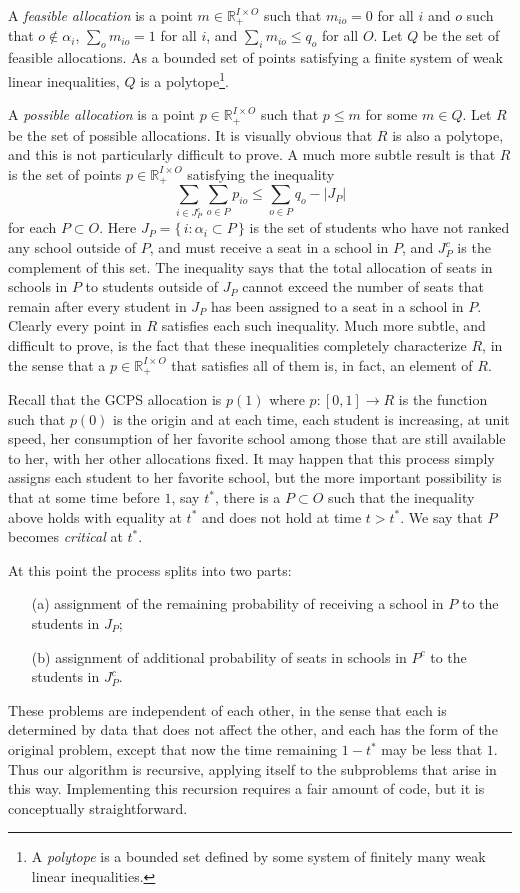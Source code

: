 \documentclass[12pt]{article}
\theoremstyle{definition}
\renewcommand{\Re}{\mathbb{R}}
\begin{document}
\begin{appendix}
A \emph{feasible allocation} is a point $m \in \Re^{I \times O}_+$
such that $m_{io} = 0$ for all $i$ and $o$ such that $o \notin
\alpha_i$, $\sum_o m_{io} = 1$ for all $i$, and $\sum_i m_{io} \le
q_o$ for all $O$.  Let $Q$ be the set of feasible allocations.  As a
bounded set of points satisfying a finite system of weak linear
inequalities, $Q$ is a polytope\footnote{A \emph{polytope} is a bounded set
defined by some system of finitely many weak linear inequalities.}.

A \emph{possible allocation} is a point $p \in \Re^{I \times O}_+$
such that $p \le m$ for some $m \in Q$.  Let $R$ be the set of
possible allocations.  It is visually obvious that $R$ is also a
polytope, and this is not particularly difficult to prove.  A much
more subtle result is that $R$ is the set of points $p \in \Re^{I
  \times O}_+$ satisfying the inequality
$$\sum_{i \in J_P^c}\sum_{o \in P} p_{io} \le \sum_{o \in P} q_o -
|J_P|$$ for each $P \subset O$.  Here $J_P = \{\, i : \alpha_i \subset
P \,\}$ is the set of students who have not ranked any school outside
of $P$, and must receive a seat in a school in $P$, and $J_P^c$ is the
complement of this set.  The inequality says that the total allocation
of seats in schools in $P$ to students outside of $J_P$ cannot exceed
the number of seats that remain after every student in $J_P$ has been
assigned to a seat in a school in $P$.  Clearly every point in $R$
satisfies each such inequality.  Much more subtle, and difficult to
prove, is the fact that these inequalities completely characterize
$R$, in the sense that a $p \in \Re^{I \times O}_+$ that satisfies all
of them is, in fact, an element of $R$.

Recall that the GCPS allocation is $p(1)$ where $p \colon [0,1] \to R$
is the function such that $p(0)$ is the origin and at each time, each
student is increasing, at unit speed, her consumption of her favorite
school among those that are still available to her, with her other
allocations fixed.  It may happen that this process simply assigns
each student to her favorite school, but the more important
possibility is that at some time before $1$, say $t^*$, there is a $P
\subset O$ such that the inequality above holds with equality at $t^*$
and does not hold at time $t > t^*$.  We say that $P$ becomes
\emph{critical} at $t^*$.

At this point the process splits into two parts:
\begin{enumerate}
  \item[(a)] assignment of the remaining probability of receiving a
    school in $P$ to the students in $J_P$;
  \item[(b)] assignment of additional probability of seats in schools
    in $P^c$ to the students in $J_P^c$.
\end{enumerate}
These problems are independent of each other, in the sense that each
is determined by data that does not affect the other, and each has the
form of the original problem, except that now the time remaining $1 -
t^*$ may be less that $1$.  Thus our algorithm is recursive, applying
itself to the subproblems that arise in this way.  Implementing this
recursion requires a fair amount of code, but it is conceptually
straightforward.


\end{appendix}
\end{document}
